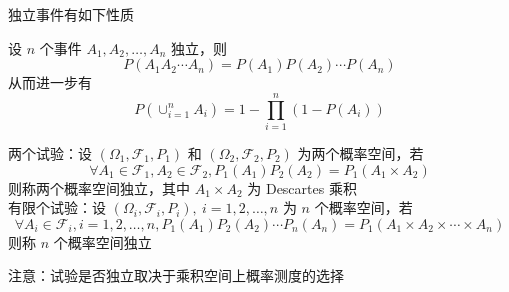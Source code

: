 \documentclass[12pt,a4paper]{amsart}
\begin{document}
独立事件有如下性质

\begin{proposition}
    设 $n$ 个事件 $A_1,A_2,\ldots,A_n$ 独立，则
    \begin{equation}
        P(A_1A_2\cdots A_n) = P(A_1)P(A_2)\cdots P(A_n)
    \end{equation}
    从而进一步有
    \begin{equation}
        P(\cup_{i=1}^n A_i) = 1 - \prod_{i=1}^n (1-P(A_i))
    \end{equation}
\end{proposition}

\begin{definition}[试验独立性]
    两个试验：设 $(\Omega_1, \mathcal{F}_1, P_1)$ 和 $(\Omega_2, \mathcal{F}_2, P_2)$ 为两个概率空间，若
    \begin{equation}
        \forall A_1\in\mathcal{F}_1, A_2\in\mathcal{F}_2, P_1(A_1)P_2(A_2) = P_1(A_1\times A_2)
    \end{equation}
    则称两个概率空间独立，其中 $A_1\times A_2$ 为 Descartes 乘积 \\
    有限个试验：设 $(\Omega_i, \mathcal{F}_i, P_i),~ i=1,2,\ldots,n$ 为 $n$ 个概率空间，若
    \begin{equation}
        \forall A_i\in\mathcal{F}_i, i=1,2,\ldots,n, P_1(A_1)P_2(A_2)\cdots P_n(A_n) = P_1(A_1\times A_2\times\cdots\times A_n) 
    \end{equation}
    则称 $n$ 个概率空间独立
\end{definition}

注意：试验是否独立取决于乘积空间上概率测度的选择

\appendix



{\footnotesize}
\end{document}
